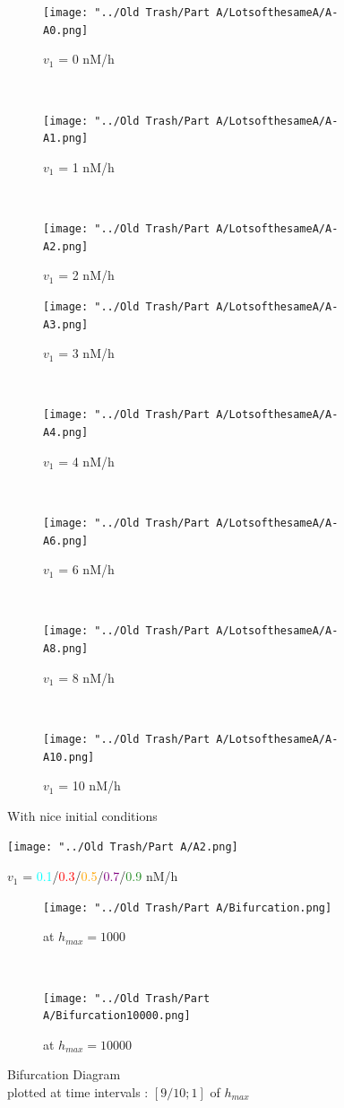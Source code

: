 \documentclass[10pt,a4paper,oneside,twocolumn]{article}
\newcommand{\red}[1]{\textcolor{red}{#1}}
\newcommand{\cyan}[1]{\textcolor{cyan}{#1}}
\newcommand{\orange}[1]{\textcolor{orange}{#1}}
\newcommand{\purple}[1]{\textcolor{purple}{#1}}
\newcommand{\green}[1]{\textcolor{forestgreen}{#1}}
\numberwithin{equation}{section} %
\begin{document}
    \begin{figure}
    \centering
	\begin{subfigure}[b]{0.32\textwidth}
	    \texttt{[image: "../Old Trash/Part A/LotsofthesameA/A-A0.png]}
	    \caption{$v_1$ = 0 nM/h}
	    \end{subfigure}
	    ~ 
	    \begin{subfigure}[b]{0.32\textwidth}
	    \texttt{[image: "../Old Trash/Part A/LotsofthesameA/A-A1.png]}
	    \caption{$v_1$ = 1 nM/h}
	    \end{subfigure}
	    ~ 
	\begin{subfigure}[b]{0.32\textwidth}
	    \texttt{[image: "../Old Trash/Part A/LotsofthesameA/A-A2.png]}
	    \caption{$v_1$ = 2 nM/h}
	\end{subfigure}
	 
	\begin{subfigure}[b]{0.32\textwidth}
	    \texttt{[image: "../Old Trash/Part A/LotsofthesameA/A-A3.png]}
	    \caption{$v_1$ = 3 nM/h}
	\end{subfigure}
	~ 
	\begin{subfigure}[b]{0.32\textwidth}
	    \texttt{[image: "../Old Trash/Part A/LotsofthesameA/A-A4.png]}
	    \caption{$v_1$ = 4 nM/h}
	\end{subfigure}
	~
	\begin{subfigure}[b]{0.32\textwidth}
	    \texttt{[image: "../Old Trash/Part A/LotsofthesameA/A-A6.png]}
	    \caption{$v_1$ = 6 nM/h}
	\end{subfigure}
	~ 
	\begin{subfigure}[b]{0.32\textwidth}
	    \texttt{[image: "../Old Trash/Part A/LotsofthesameA/A-A8.png]}
	    \caption{$v_1$ = 8 nM/h}
	\end{subfigure}
	~
	\begin{subfigure}[b]{0.32\textwidth}
	    \texttt{[image: "../Old Trash/Part A/LotsofthesameA/A-A10.png]}
	    \caption{$v_1$ = 10 nM/h}
	\end{subfigure}

	\caption{With nice initial conditions}
    \end{figure}

    \begin{figure}
	\centering
	    \texttt{[image: "../Old Trash/Part A/A2.png]}
	    \caption{$v_1$ = \cyan{0.1}/\red{0.3}/\orange{0.5}/\purple{0.7}/\green{0.9} nM/h}
    \end{figure}

    \begin{figure}
	\centering
	    \begin{subfigure}[b]{0.45\textwidth}
		\texttt{[image: "../Old Trash/Part A/Bifurcation.png]}
		\caption{at $h_{max}=1000$}
	    \end{subfigure}
	     ~ 
	    \begin{subfigure}[b]{0.45\textwidth}
		\texttt{[image: "../Old Trash/Part A/Bifurcation10000.png]}
		\caption{at $h_{max}=10000$}
	    \end{subfigure}
	    \caption{Bifurcation Diagram\\ plotted at time intervals : $[9/10; 1]$ of $h_{max}$}
    \end{figure}
\end{document}
